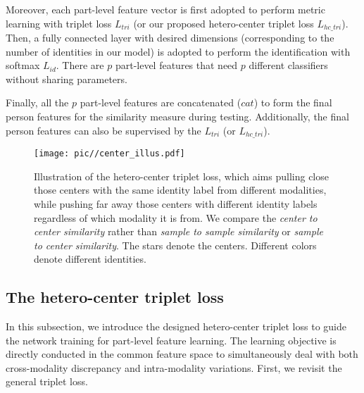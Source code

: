 \documentclass[journal]{IEEEtran}
\begin{document}
Moreover, each part-level feature vector is first adopted to perform metric learning with triplet loss $L_{tri}$ (or our proposed hetero-center triplet loss $L_{hc\_tri}$). Then, a fully connected layer with desired dimensions (corresponding to the number of identities in our model) is adopted to perform the identification with softmax $L_{id}$. There are $p$ part-level features that need $p$ different classifiers without sharing parameters.

Finally, all the $p$ part-level features are concatenated ($cat$) to form the final person features for the similarity measure during testing. Additionally, the final person features can also be supervised by the $L_{tri}$ (or $L_{hc\_tri}$).

\begin{figure}
\centering
\texttt{[image: pic//center\_illus.pdf]}
\caption{Illustration of the hetero-center triplet loss, which aims pulling close those centers with the same identity label from different modalities, while pushing far away those centers with different identity labels regardless of which modality it is from. We compare the \emph{center to center similarity} rather than \emph{sample to sample similarity} or \emph{sample to center similarity}. The stars denote the centers. Different colors denote different identities. }
\label{fig:center_illus}
\end{figure}

\subsection{The hetero-center triplet loss}
In this subsection, we introduce the designed hetero-center triplet loss to guide the network training for part-level feature learning. The learning objective is directly conducted in the common feature space to simultaneously deal with both cross-modality discrepancy and intra-modality variations.
First, we revisit the general triplet loss.
\end{document}
